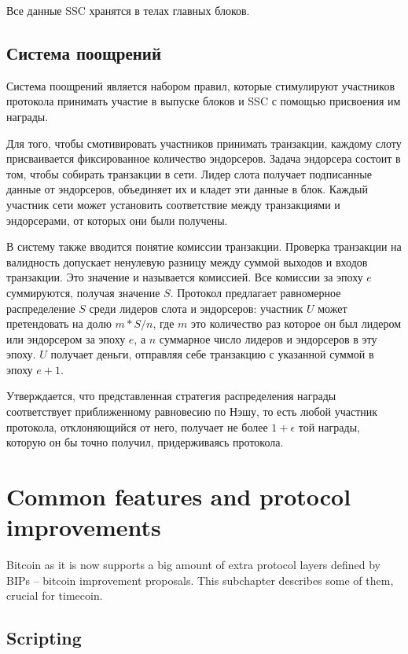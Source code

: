\documentclass[]{itmo-student-thesis}
\begin{document}
Все данные SSC хранятся в телах главных блоков.

\subsection{Система поощрений}

Система поощрений является набором правил, которые стимулируют
участников протокола принимать участие в выпуске блоков и SSC с
помощью присвоения им награды.

Для того, чтобы смотивировать участников принимать транзакции, каждому
слоту присваивается фиксированное количество эндорсеров. Задача
эндорсера состоит в том, чтобы собирать транзакции в сети. Лидер слота
получает подписанные данные от эндорсеров, объединяет их и кладет эти
данные в блок. Каждый участник сети может установить соответствие
между транзакциями и эндорсерами, от которых они были получены.

В систему также вводится понятие комиссии транзакции. Проверка
транзакции на валидность допускает ненулевую разницу между суммой
выходов и входов транзакции. Это значение и называется комиссией. Все
комиссии за эпоху $e$ суммируются, получая значение $S$. Протокол
предлагает равномерное распределение $S$ среди лидеров слота и
эндорсеров: участник $U$ может претендовать на долю $m * S / n$, где
$m$ это количество раз которое он был лидером или эндорсером за эпоху
$e$, а $n$ суммарное число лидеров и эндорсеров в эту эпоху. $U$
получает деньги, отправляя себе транзакцию с указанной суммой в эпоху
$e+1$.

Утверждается, что представленная стратегия распределения награды
соответствует приближенному равновесию по Нэшу, то есть любой участник
протокола, отклоняющийся от него, получает не более $1 + \epsilon$ той
награды, которую он бы точно получил, придерживаясь протокола.

\section{Common features and protocol improvements}

Bitcoin as it is now supports a big amount of extra protocol layers
defined by BIPs -- bitcoin improvement proposals. This subchapter
describes some of them, crucial for timecoin.

\subsection{Scripting}
\end{document}
